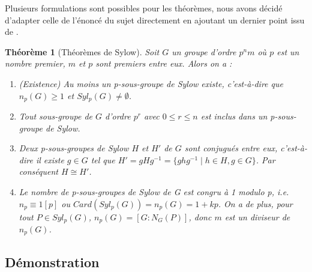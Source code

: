 \documentclass{article}
\theoremstyle{definition}
\theoremstyle{plain}
\newtheorem{theorem}[subsubsection]{Théorème}
\theoremstyle{plain}
\theoremstyle{plain}
\theoremstyle{plain}
\theoremstyle{definition}
\theoremstyle{plain}
\theoremstyle{plain}
\begin{document}
Plusieurs formulations sont possibles pour les théorèmes, 
nous avons décidé d'adapter celle de l'énoncé du sujet directement en ajoutant un dernier point issu de \cite[p.~215]{chen2024napkin}.

\begin{theorem}[Théorèmes de Sylow]\label{theorem:S}
	Soit \( G \) un groupe d'ordre \( p^{n}m \) où \( p \) est un nombre premier, \( m \) et \( p \) sont premiers entre eux. Alors on a :
	\begin{enumerate}[label={\upshape(\roman*)}]
		\item (Existence) Au moins un p-sous-groupe de Sylow existe, c'est-à-dire que \( n_{p}(G) \geq 1 \) et \( Syl_{p}(G) \neq \emptyset \).\label{S1}
		\item Tout sous-groupe de \( G \) d'ordre \( p^{r} \) avec \( 0 \leq r \leq n \) est inclus dans un p-sous-groupe de Sylow. \label{S2}
		\item Deux p-sous-groupes de Sylow \( H \) et \( H' \) de \( G \) sont conjugués entre eux, c'est-à-dire il existe \( g \in G \) tel que \( H' = gHg^{-1} = \{ ghg^{-1} \mid h \in H, g \in G \} \). Par conséquent \( H \cong H' \).\label{S3}
		\item Le nombre de p-sous-groupes de Sylow de G est congru à 1 modulo p, i.e. \( n_{p} \equiv 1 [p] \) ou \( Card(Syl_{p}({G})) = n_{p}(G) = 1 + kp \). 
			On a de plus, pour tout \( P \in Syl_{p}({G}) \), \( n_{p}({G}) = [G : N_{G}({P}) ] \), donc \( m \) est un diviseur de \( n_p({G}) \).\label{S4}
	\end{enumerate}

\end{theorem}

\subsection{Démonstration}
\end{document}
